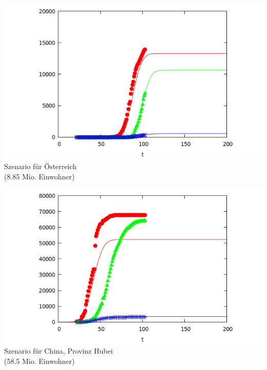 \documentclass[a4paper,11pt]{article}
\begin{document}
\begin{center}
  \begin{minipage}{.48\textwidth}\centering    
  \includegraphics[width=.8\textwidth]{Austria.png}\\[1em]
  {Szenario für Österreich\\ (8.85 Mio. Einwohner)}
  \end{minipage}\hfill
  \begin{minipage}{.48\textwidth}\centering                  
  \includegraphics[width=.8\textwidth]{Hubei.png}\\[1em]
  {Szenario für China, Provinz Hubei\\ (58.5 Mio. Einwohner)}
  \end{minipage}
\end{center}
\end{document}
